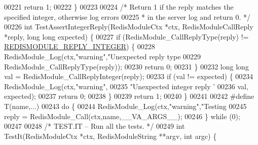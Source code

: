 \begin{DoxyCode}
{{{{00221     \textcolor{keywordflow}{return} 1;
00222 \}
00223 
00224 \textcolor{comment}{/* Return 1 if the reply matches the specified integer, otherwise log errors}
00225 \textcolor{comment}{ * in the server log and return 0. */}
00226 \textcolor{keywordtype}{int} TestAssertIntegerReply(RedisModuleCtx *ctx, RedisModuleCallReply *reply, \textcolor{keywordtype}{long} \textcolor{keywordtype}{long} expected) \{
00227     \textcolor{keywordflow}{if} (RedisModule\_CallReplyType(reply) != \hyperlink{redismodule_8h_a9cff1d7e4fdc52b273949ed0d83e916b}{REDISMODULE\_REPLY\_INTEGER}) \{
00228         RedisModule\_Log(ctx,\textcolor{stringliteral}{"warning"},\textcolor{stringliteral}{"Unexpected reply type %
00229             RedisModule\_CallReplyType(reply));
00230         \textcolor{keywordflow}{return} 0;
00231     \}
00232     \textcolor{keywordtype}{long} \textcolor{keywordtype}{long} val = RedisModule\_CallReplyInteger(reply);
00233     \textcolor{keywordflow}{if} (val != expected) \{
00234         RedisModule\_Log(ctx,\textcolor{stringliteral}{"warning"},
00235             \textcolor{stringliteral}{"Unexpected integer reply '%
00236             val, expected);
00237         \textcolor{keywordflow}{return} 0;
00238     \}
00239     \textcolor{keywordflow}{return} 1;
00240 \}
00241 
00242 \textcolor{preprocessor}{#}\textcolor{preprocessor}{define} \textcolor{preprocessor}{T}\textcolor{preprocessor}{(}\textcolor{preprocessor}{name}\textcolor{preprocessor}{,}\textcolor{preprocessor}{...}\textcolor{preprocessor}{)}
00243     \textcolor{keywordflow}{do} \textcolor{preprocessor}{\{}
00244         \textcolor{preprocessor}{RedisModule\_Log}\textcolor{preprocessor}{(}\textcolor{preprocessor}{ctx}\textcolor{preprocessor}{,}\textcolor{stringliteral}{"warning"}\textcolor{preprocessor}{,}\textcolor{stringliteral}{"Testing %
00245         \textcolor{preprocessor}{reply} \textcolor{preprocessor}{=} \textcolor{preprocessor}{RedisModule\_Call}\textcolor{preprocessor}{(}\textcolor{preprocessor}{ctx}\textcolor{preprocessor}{,}\textcolor{preprocessor}{name}\textcolor{preprocessor}{,}\textcolor{preprocessor}{\_\_VA\_ARGS\_\_}\textcolor{preprocessor}{)}\textcolor{preprocessor}{;}
00246     \textcolor{preprocessor}{\}} \textcolor{keywordflow}{while} \textcolor{preprocessor}{(}0\textcolor{preprocessor}{)}\textcolor{preprocessor}{;}
00247 
00248 \textcolor{comment}{/* TEST.IT -- Run all the tests. */}
00249 \textcolor{keywordtype}{int} TestIt(RedisModuleCtx *ctx, RedisModuleString **argv, \textcolor{keywordtype}{int} argc) \{
}}}}}}}
\end{DoxyCode}
